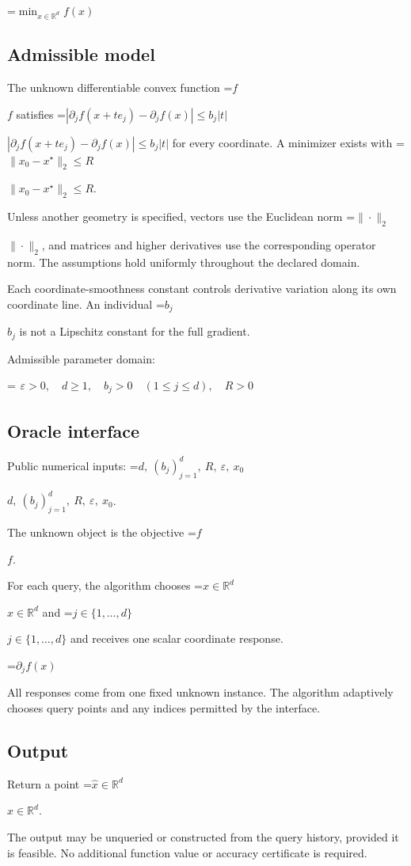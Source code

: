 \documentclass[10pt,a4paper]{article}
\newcommand{\AtlasMath}[1]{\par\begingroup\centering\setbox0=\hbox{$\displaystyle #1$}\ifdim\wd0>1.4\linewidth\typeout{ATLAS WIDE FORMULA: \the\wd0}\fi\ifdim\wd0>\linewidth\resizebox{\linewidth}{!}{\box0}\else\box0\fi\par\endgroup}
\newcommand{\AtlasInlineMath}[1]{\begingroup\setbox0=\hbox{$#1$}\ifdim\wd0>.4\linewidth\endgroup\AtlasMath{#1}\else\endgroup$#1$\fi}
\begin{document}
\AtlasMath{\min_{x\in \mathbb{R}^d}f(x)}


\subsection{Admissible model}
The unknown differentiable convex function \AtlasInlineMath{f} satisfies \AtlasInlineMath{|\partial_jf(x+te_j)-\partial_jf(x)|\le b_j|t|} for every coordinate. A minimizer exists with \AtlasInlineMath{\|x_0-x^\star\|_2\le R}.

Unless another geometry is specified, vectors use the Euclidean norm \AtlasInlineMath{\|\cdot\|_2}, and matrices and higher derivatives use the corresponding operator norm. The assumptions hold uniformly throughout the declared domain.

Each coordinate-smoothness constant controls derivative variation along its own coordinate line. An individual \AtlasInlineMath{b_j} is not a Lipschitz constant for the full gradient.

Admissible parameter domain:


\AtlasMath{\begin{gathered}\varepsilon > 0,\quad d \ge 1,\quad b_j>0\quad(1\le j\le d),\quad R > 0\end{gathered}}


\subsection{Oracle interface}
Public numerical inputs: \AtlasInlineMath{d,\ (b_j)_{j=1}^d,\ R,\ \varepsilon,\ x_0}.

The unknown object is the objective \AtlasInlineMath{f}.

For each query, the algorithm chooses \AtlasInlineMath{x\in\mathbb R^d} and \AtlasInlineMath{j\in\{1,\ldots,d\}} and receives one scalar coordinate response.


\AtlasMath{\partial_j f(x)}


All responses come from one fixed unknown instance. The algorithm adaptively chooses query points and any indices permitted by the interface.

\subsection{Output}
Return a point \AtlasInlineMath{\widehat x\in\mathbb R^d}.

The output may be unqueried or constructed from the query history, provided it is feasible. No additional function value or accuracy certificate is required.
\end{document}
